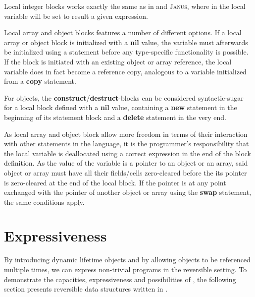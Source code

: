 Local integer blocks works exactly the same as in  and \textsc{Janus}, where in the local variable will be set to result a given expression.

Local array and object blocks features a number of different options. If a local array or object block is initialized with a \textbf{nil} value, the variable must afterwards be initialized using a  statement before any type-specific functionality is possible. If the block is initiated with an existing object or array reference, the local variable does in fact become a reference copy, analogous to a variable initialized from a \textbf{copy} statement. 

For objects, the \textbf{construct}/\textbf{destruct}-blocks can be considered syntactic-sugar for a local block defined with a \textbf{nil} value, containing a \textbf{new} statement in the beginning of its statement block and a \textbf{delete} statement in the very end.

As local array and object block allow more freedom in terms of their interaction with other statements in the language, it is the programmer's responsibility that the local variable is deallocated using a correct expression in the end of the block definition. As the value of the variable is a pointer to an object or an array, said object or array must have all their fields/cells zero-cleared before the its pointer is zero-cleared at the end of the local block. If the pointer is at any point exchanged with the pointer of another object or array using the \textbf{swap} statement, the same conditions apply.  


\section{\rooplpp Expressiveness}
\label{sec:rooplpp-expressiveness}
By introducing dynamic lifetime objects and by allowing objects to be referenced multiple times, we can express non-trivial programs in the reversible setting. To demonstrate the capacities, expressiveness and possibilities of \rooplpp, the following section presents reversible data structures written in \rooplpp.

